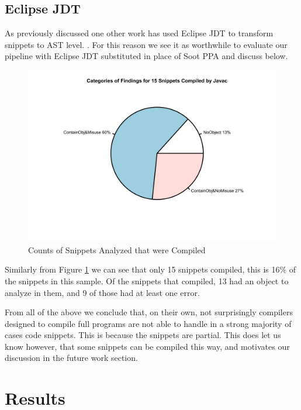 \documentclass[10pt, conference]{IEEEtran}
\begin{document}
\subsection{Eclipse JDT}

As previously discussed one other work has used Eclipse JDT to transform snippets to AST level. \cite{Subramanian:2013:MSO:2487085.2487106}. For this reason we see it as worthwhile to evaluate our pipeline with Eclipse JDT substituted in place of Soot PPA and discuss below.

\begin{figure}[h]
\begin{center}
\includegraphics[width=0.9\linewidth]{PieJDT.png}
\caption{Counts of Snippets Analyzed that were Compiled \label{fig:jdtPie}}
\end{center}
\end{figure}

Similarly from Figure \ref{fig:jdtPie} we can see that only 15 snippets compiled, this is 16\% of the snippets in this sample. Of the snippets that compiled, 13 had an object to analyze in them, and 9 of those had at least one error.

From all of the above we conclude that, on their own, not surprisingly compilers designed to compile full programs are not able to handle in a strong majority of cases code snippets. This is because the snippets are partial. This does let us know however, that some snippets can be compiled this way, and motivates our discussion in the future work section.

\section{Results}
\end{document}
